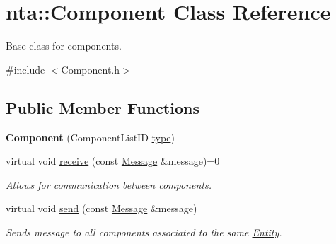 \hypertarget{classnta_1_1Component}{}\section{nta\+:\+:Component Class Reference}
\label{classnta_1_1Component}


Base class for components.  




{\ttfamily \#include $<$Component.\+h$>$}

\subsection*{Public Member Functions}
\begin{DoxyCompactItemize}
\item 
\mbox{\label{classnta_1_1Component_a61a9771941690417f476c1d294b10ec7}} 
{\bfseries Component} (Component\+List\+ID \hyperlink{classnta_1_1Component_a6c27f772281fd6ae13892386a75e7b4e}{type})
\item 
\mbox{\label{classnta_1_1Component_a444c7d01911b4b348abcd3e464b367df}} 
virtual void \hyperlink{classnta_1_1Component_a444c7d01911b4b348abcd3e464b367df}{receive} (const \hyperlink{structnta_1_1Message}{Message} \&message)=0
\begin{DoxyCompactList}\small\item\em Allows for communication between components. \end{DoxyCompactList}\item 
\mbox{\label{classnta_1_1Component_ab0dd70aa6df1ac166095bf1919ab8cdc}} 
virtual void \hyperlink{classnta_1_1Component_ab0dd70aa6df1ac166095bf1919ab8cdc}{send} (const \hyperlink{structnta_1_1Message}{Message} \&message)
\begin{DoxyCompactList}\small\item\em Sends message to all components associated to the same \hyperlink{classnta_1_1Entity}{Entity}. \end{DoxyCompactList}\end{DoxyCompactItemize}

